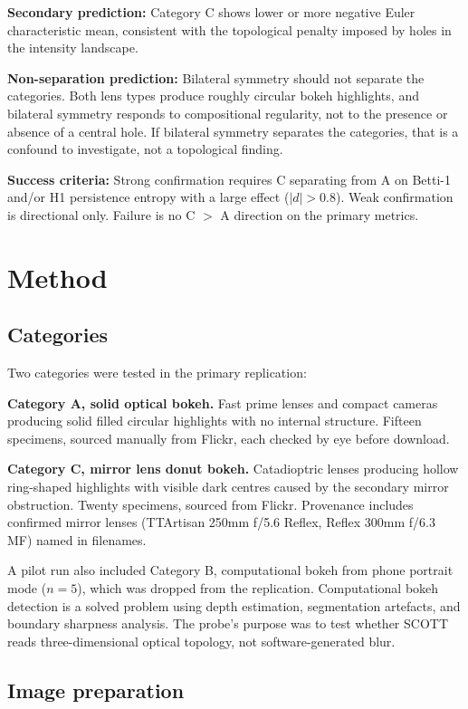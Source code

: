 \documentclass[11pt,a4paper]{article}
\begin{document}
\textbf{Secondary prediction:} Category C shows lower or more negative Euler characteristic mean, consistent with the topological penalty imposed by holes in the intensity landscape.

\textbf{Non-separation prediction:} Bilateral symmetry should not separate the categories. Both lens types produce roughly circular bokeh highlights, and bilateral symmetry responds to compositional regularity, not to the presence or absence of a central hole. If bilateral symmetry separates the categories, that is a confound to investigate, not a topological finding.

\textbf{Success criteria:} Strong confirmation requires C separating from A on Betti-1 and/or H1 persistence entropy with a large effect ($|d| > 0.8$). Weak confirmation is directional only. Failure is no C $>$ A direction on the primary metrics.

\section{Method}

\subsection{Categories}

Two categories were tested in the primary replication:

\textbf{Category A, solid optical bokeh.} Fast prime lenses and compact cameras producing solid filled circular highlights with no internal structure. Fifteen specimens, sourced manually from Flickr, each checked by eye before download.

\textbf{Category C, mirror lens donut bokeh.} Catadioptric lenses producing hollow ring-shaped highlights with visible dark centres caused by the secondary mirror obstruction. Twenty specimens, sourced from Flickr. Provenance includes confirmed mirror lenses (TTArtisan 250mm f/5.6 Reflex, Reflex 300mm f/6.3 MF) named in filenames.

A pilot run also included Category B, computational bokeh from phone portrait mode ($n=5$), which was dropped from the replication. Computational bokeh detection is a solved problem using depth estimation, segmentation artefacts, and boundary sharpness analysis. The probe's purpose was to test whether SCOTT reads three-dimensional optical topology, not software-generated blur.

\subsection{Image preparation}
\end{document}
